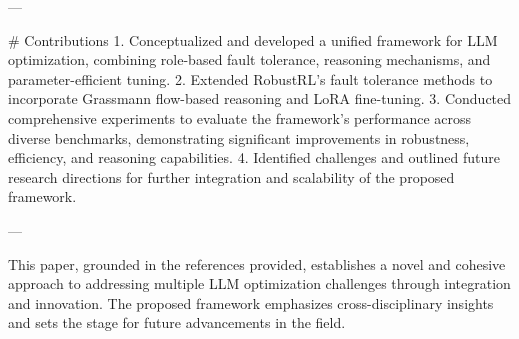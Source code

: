 ---

# Contributions  
1. Conceptualized and developed a unified framework for LLM optimization, combining role-based fault tolerance, reasoning mechanisms, and parameter-efficient tuning.  
2. Extended RobustRL's fault tolerance methods to incorporate Grassmann flow-based reasoning and LoRA fine-tuning.  
3. Conducted comprehensive experiments to evaluate the framework's performance across diverse benchmarks, demonstrating significant improvements in robustness, efficiency, and reasoning capabilities.  
4. Identified challenges and outlined future research directions for further integration and scalability of the proposed framework.

--- 

This paper, grounded in the references provided, establishes a novel and cohesive approach to addressing multiple LLM optimization challenges through integration and innovation. The proposed framework emphasizes cross-disciplinary insights and sets the stage for future advancements in the field.